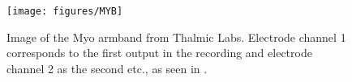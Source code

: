 \begin{figure}[H]                 
	\texttt{[image: figures/MYB]}  
	\caption{Image of the Myo armband from Thalmic Labs. Electrode channel 1 corresponds to the first output in the recording and electrode channel 2 as the second etc., as seen in .}
	\label{fig:MYB} 
\end{figure}